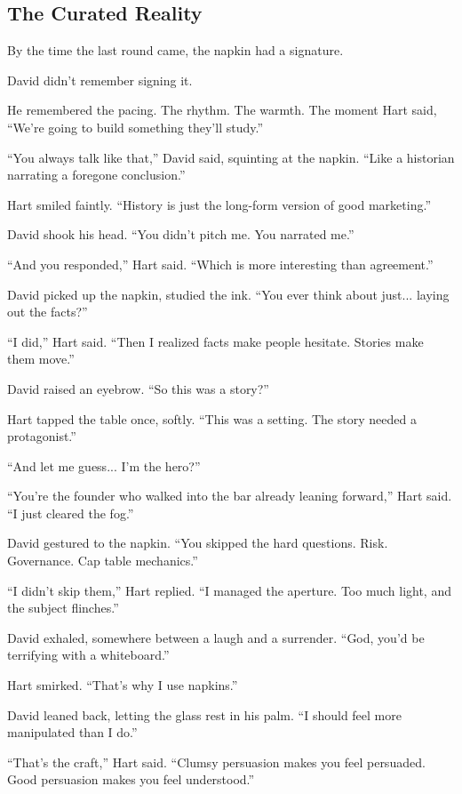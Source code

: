 \subsection{The Curated Reality}


By the time the last round came, the napkin had a signature.

David didn’t remember signing it.

He remembered the pacing. The rhythm. The warmth.
The moment Hart said, ``We’re going to build something they’ll study.''

``You always talk like that,'' David said, squinting at the napkin. ``Like a historian narrating a foregone conclusion.''

Hart smiled faintly. ``History is just the long-form version of good marketing.''

David shook his head. ``You didn’t pitch me. You narrated me.''

``And you responded,'' Hart said. ``Which is more interesting than agreement.''

David picked up the napkin, studied the ink. ``You ever think about just... laying out the facts?''

``I did,'' Hart said. ``Then I realized facts make people hesitate. Stories make them move.''

David raised an eyebrow. ``So this was a story?''

Hart tapped the table once, softly. ``This was a setting. The story needed a protagonist.''

``And let me guess... I’m the hero?''

``You’re the founder who walked into the bar already leaning forward,'' Hart said. ``I just cleared the fog.''

David gestured to the napkin. ``You skipped the hard questions. Risk. Governance. Cap table mechanics.''

``I didn’t skip them,'' Hart replied. ``I managed the aperture. Too much light, and the subject flinches.''

David exhaled, somewhere between a laugh and a surrender. ``God, you’d be terrifying with a whiteboard.''

Hart smirked. ``That’s why I use napkins.''

David leaned back, letting the glass rest in his palm. ``I should feel more manipulated than I do.''

``That’s the craft,'' Hart said. ``Clumsy persuasion makes you feel persuaded. Good persuasion makes you 
feel understood.''

